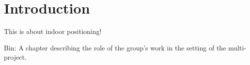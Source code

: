\chapter{Introduction}
This is about indoor positioning!


Bin: A chapter describing the role of the group’s work in the setting of the multi-project.